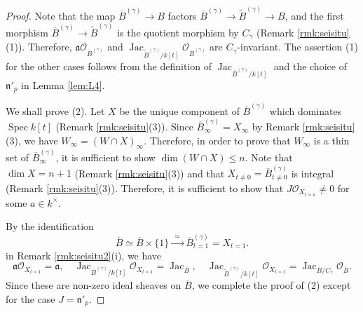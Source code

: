 \documentclass[a4paper,11pt]{amsart}
\theoremstyle{definition}
\theoremstyle{remark}
\begin{document}
\begin{proof}
Note that the map $\overline{B}^{(\gamma)} \to B$ factors $\overline{B}^{(\gamma)} \to \widetilde{B}^{(\gamma)} \to B$, and the first morphism $\overline{B}^{(\gamma)} \to \widetilde{B}^{(\gamma)}$ is the quotient morphism by $C_{\gamma}$ (Remark \ref{rmk:seisitu}(1)). 
Therefore, $\mathfrak{a} \mathcal{O}_{\overline{B}^{(\gamma)}}$ and $\operatorname{Jac}_{\widetilde{B}^{(\gamma)}/k[t]} \mathcal{O}_{\overline{B}^{(\gamma)}}$ are $C_{\gamma}$-invariant. The assertion (1) for the other cases follows from the definition of $\operatorname{Jac}_{\overline{B}^{(\gamma)}/k[t]}$ and the choice of $\mathfrak{n}'_{p}$ in Lemma \ref{lem:L4}. 

We shall prove (2). 
Let $X$ be the unique component of $\overline{B}^{(\gamma)}$ which dominates $\operatorname{Spec} k[t]$ (Remark \ref{rmk:seisitu}(3)). 
Since $\overline{B}^{(\gamma)} _{\infty} = X_{\infty}$ by Remark \ref{rmk:seisitu}(3), we have 
$W_{\infty} = (W \cap X)_{\infty}$. 
Therefore, in order to prove that $W_{\infty}$ is a thin set of $\overline{B}^{(\gamma)} _{\infty}$, it is sufficient to show $\dim (W \cap X) \le n$. 
Note that $\dim X = n+1$ (Remark \ref{rmk:seisitu}(3)) and that
$X_{t \not = 0} = \overline{B}^{(\gamma)}_{t \not = 0}$ is integral (Remark \ref{rmk:seisitu}(3)). 
Therefore, it is sufficient to show that $J \mathcal{O}_{X_{t=a}} \not = 0$ for some $a \in k^{\times}$. 

By the identification 
\[
\overline{B} \simeq \overline{B} \times \{ 1 \} \xrightarrow{\ \ \simeq \ \ } \overline{B}^{(\gamma)}_{t = 1} = X_{t = 1}. 
\]
in Remark \ref{rmk:seisitu2}(i), we have 
\[
\mathfrak{a} \mathcal{O}_{X_{t=1}} = \mathfrak{a}, \quad
\operatorname{Jac}_{\overline{B}^{(\gamma)}/k[t]} \mathcal{O}_{X_{t=1}} = \operatorname{Jac}_{\overline{B}}, \quad
\operatorname{Jac}_{\widetilde{B}^{(\gamma)}/k[t]} \mathcal{O}_{X_{t=1}} = 
\operatorname{Jac}_{\overline{B}/{C_{\gamma}}} \mathcal{O}_{\overline{B}}. 
\]
Since these are non-zero ideal sheaves on $\overline{B}$, we complete the proof of (2) except for the case $J = \mathfrak{n}'_{p}$. 


\end{proof}
\end{document}
